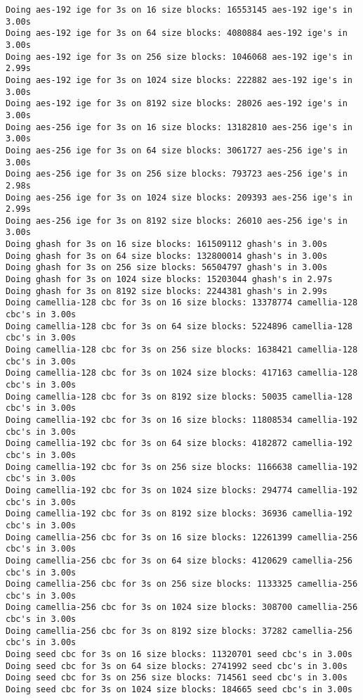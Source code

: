 \documentclass[a4paper,11pt]{article}
\theoremstyle{mytheor}
\begin{document}
\begin{lstlisting}
Doing aes-192 ige for 3s on 16 size blocks: 16553145 aes-192 ige's in 3.00s
Doing aes-192 ige for 3s on 64 size blocks: 4080884 aes-192 ige's in 3.00s
Doing aes-192 ige for 3s on 256 size blocks: 1046068 aes-192 ige's in 2.99s
Doing aes-192 ige for 3s on 1024 size blocks: 222882 aes-192 ige's in 3.00s
Doing aes-192 ige for 3s on 8192 size blocks: 28026 aes-192 ige's in 3.00s
Doing aes-256 ige for 3s on 16 size blocks: 13182810 aes-256 ige's in 3.00s
Doing aes-256 ige for 3s on 64 size blocks: 3061727 aes-256 ige's in 3.00s
Doing aes-256 ige for 3s on 256 size blocks: 793723 aes-256 ige's in 2.98s
Doing aes-256 ige for 3s on 1024 size blocks: 209393 aes-256 ige's in 2.99s
Doing aes-256 ige for 3s on 8192 size blocks: 26010 aes-256 ige's in 3.00s
Doing ghash for 3s on 16 size blocks: 161509112 ghash's in 3.00s
Doing ghash for 3s on 64 size blocks: 132800014 ghash's in 3.00s
Doing ghash for 3s on 256 size blocks: 56504797 ghash's in 3.00s
Doing ghash for 3s on 1024 size blocks: 15203044 ghash's in 2.97s
Doing ghash for 3s on 8192 size blocks: 2244381 ghash's in 2.99s
Doing camellia-128 cbc for 3s on 16 size blocks: 13378774 camellia-128 cbc's in 3.00s
Doing camellia-128 cbc for 3s on 64 size blocks: 5224896 camellia-128 cbc's in 3.00s
Doing camellia-128 cbc for 3s on 256 size blocks: 1638421 camellia-128 cbc's in 3.00s
Doing camellia-128 cbc for 3s on 1024 size blocks: 417163 camellia-128 cbc's in 3.00s
Doing camellia-128 cbc for 3s on 8192 size blocks: 50035 camellia-128 cbc's in 3.00s
Doing camellia-192 cbc for 3s on 16 size blocks: 11808534 camellia-192 cbc's in 3.00s
Doing camellia-192 cbc for 3s on 64 size blocks: 4182872 camellia-192 cbc's in 3.00s
Doing camellia-192 cbc for 3s on 256 size blocks: 1166638 camellia-192 cbc's in 3.00s
Doing camellia-192 cbc for 3s on 1024 size blocks: 294774 camellia-192 cbc's in 3.00s
Doing camellia-192 cbc for 3s on 8192 size blocks: 36936 camellia-192 cbc's in 3.00s
Doing camellia-256 cbc for 3s on 16 size blocks: 12261399 camellia-256 cbc's in 3.00s
Doing camellia-256 cbc for 3s on 64 size blocks: 4120629 camellia-256 cbc's in 3.00s
Doing camellia-256 cbc for 3s on 256 size blocks: 1133325 camellia-256 cbc's in 3.00s
Doing camellia-256 cbc for 3s on 1024 size blocks: 308700 camellia-256 cbc's in 3.00s
Doing camellia-256 cbc for 3s on 8192 size blocks: 37282 camellia-256 cbc's in 3.00s
Doing seed cbc for 3s on 16 size blocks: 11320701 seed cbc's in 3.00s
Doing seed cbc for 3s on 64 size blocks: 2741992 seed cbc's in 3.00s
Doing seed cbc for 3s on 256 size blocks: 714561 seed cbc's in 3.00s
Doing seed cbc for 3s on 1024 size blocks: 184665 seed cbc's in 3.00s

\end{lstlisting}
\end{document}

